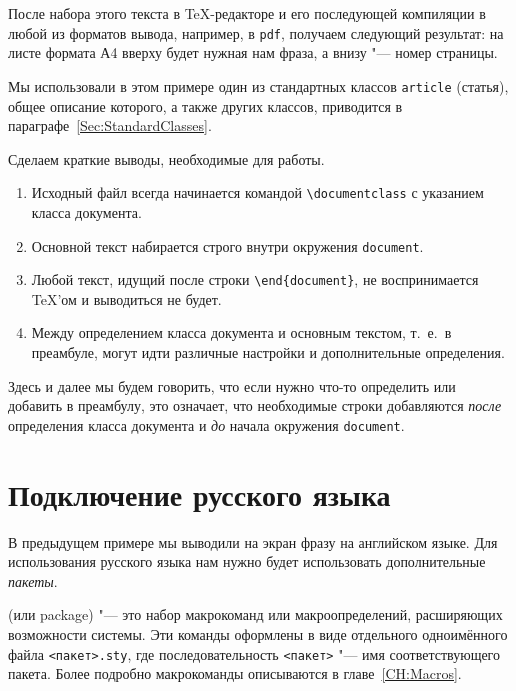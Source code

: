 После набора этого текста в \TeX-редакторе и его последующей компиляции в любой из форматов вывода, например, в \verb|pdf|, получаем следующий результат: на листе формата А4 вверху будет нужная нам фраза, а внизу "--- номер страницы.

\begin{remark}
Мы использовали в этом примере один из стандартных классов \texttt{article} (статья), общее описание которого, а также других классов, приводится в параграфе~\ref{Sec:StandardClasses}.
\end{remark}

Сделаем краткие выводы, необходимые для работы.

\begin{enumerate}
\item Исходный файл всегда начинается командой \texttt{\textbackslash documentclass} с указанием класса документа.
\item Основной текст набирается строго внутри окружения \texttt{document}.
\item Любой текст, идущий после строки \texttt{\textbackslash end\{document\}}, не воспринимается \TeX'ом и выводиться не будет.
\item Между определением класса документа и основным  текстом, т.~е.\ в преамбуле, могут идти различные настройки и дополнительные определения.
\end{enumerate}

\begin{note}
Здесь и далее мы будем говорить, что если нужно что-то определить или добавить в преамбулу, это означает, что необходимые строки добавляются \emph{после} определения класса документа и \emph{до} начала окружения \texttt{document}.
\end{note}







\section{Подключение русского языка}\label{Sec:Russian}

В предыдущем примере мы выводили на экран фразу на английском языке. Для использования русского языка нам нужно будет использовать дополнительные \emph{пакеты}.

 (или package) "--- это набор макрокоманд или макроопределений, расширяющих возможности системы. Эти команды оформлены в виде отдельного одноимённого файла \verb|<пакет>.sty|, где последовательность \verb|<пакет>| "--- имя соответствующего пакета. Более подробно макрокоманды описываются в главе~\ref{CH:Macros}.

